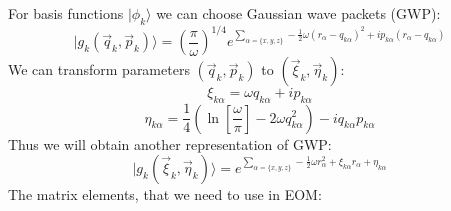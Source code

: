 For basis functions $|\phi_k\rangle$ we can choose Gaussian wave packets (GWP):
$$|g_k(\vec{q}_{k},\vec{p}_{k})\rangle = \left(\frac{\pi}{\omega}\right)^{1/4} e^{\sum_{\alpha=\{x,y,z\}}-\frac{1}{2}\omega(r_{\alpha}-q_{k\alpha})^2+%
									 ip_{k\alpha}(r_{\alpha}-q_{k\alpha})}$$
We can transform parameters $(\vec{q}_k,\vec{p}_k)$ to $(\vec{\xi}_k,\vec{\eta}_k)$:
$$\xi_{k\alpha} = \omega q_{k\alpha}+i p_{k\alpha}$$
$$\eta_{k\alpha} = \frac{1}{4}\left(\ln\left[{\frac{\omega}{\pi}}\right]-2\omega q_{k\alpha}^2\right)-iq_{k\alpha}p_{k\alpha}$$
Thus we will obtain another representation of GWP:
$$|g_k(\vec{\xi}_k,\vec{\eta}_k)\rangle=e^{\sum_{\alpha=\{x,y,z\}}-\frac{1}{2}\omega r_{\alpha}^2+\xi_{k\alpha}r_{\alpha}+\eta_{k\alpha}}$$
The matrix elements, that we need to use in EOM:

